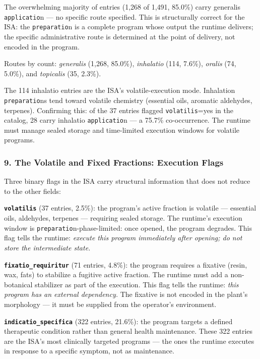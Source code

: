 \documentclass[12pt,a4paper]{article}
\begin{document}
The overwhelming majority of entries (1,268 of 1,491, 85.0\%) carry
generalis \texttt{applicatio}n --- no specific route specified. This is
structurally correct for the ISA: the \texttt{preparatio}n is a complete
program whose output the runtime delivers; the specific administrative
route is determined at the point of delivery, not encoded in the
program.

Routes by count: \emph{generalis} (1,268, 85.0\%), \emph{inhalatio}
(114, 7.6\%), \emph{oralis} (74, 5.0\%), and \emph{topicalis} (35,
2.3\%).

The 114 inhalatio entries are the ISA's volatile-execution mode.
Inhalation \texttt{preparatio}ns tend toward volatile chemistry
(essential oils, aromatic aldehydes, terpenes). Confirming this: of the
37 entries flagged \texttt{volatilis}=yes in the catalog, 28 carry
inhalatio \texttt{applicatio}n --- a 75.7\% co-occurrence. The runtime
must manage sealed storage and time-limited execution windows for
volatile programs.

\hypertarget{the-volatile-and-fixed-fractions-execution-flags}{%
\subsubsection{9. The Volatile and Fixed Fractions: Execution
Flags}\label{the-volatile-and-fixed-fractions-execution-flags}}

Three binary flags in the ISA carry structural information that does not
reduce to the other fields:

\textbf{\texttt{volatilis}} (37 entries, 2.5\%): the program's active
fraction is volatile --- essential oils, aldehydes, terpenes ---
requiring sealed storage. The runtime's execution window is
\texttt{preparatio}n-phase-limited: once opened, the program degrades.
This flag tells the runtime: \emph{execute this program immediately
after opening; do not store the intermediate state.}

\textbf{\texttt{fixatio\_requiritur}} (71 entries, 4.8\%): the program
requires a fixative (resin, wax, fats) to stabilize a fugitive active
fraction. The runtime must add a non-botanical stabilizer as part of the
execution. This flag tells the runtime: \emph{this program has an
external dependency.} The fixative is not encoded in the plant's
morphology --- it must be supplied from the operator's environment.

\textbf{\texttt{indicatio\_specifica}} (322 entries, 21.6\%): the
program targets a defined therapeutic condition rather than general
health maintenance. These 322 entries are the ISA's most clinically
targeted programs --- the ones the runtime executes in response to a
specific symptom, not as maintenance.
\end{document}
